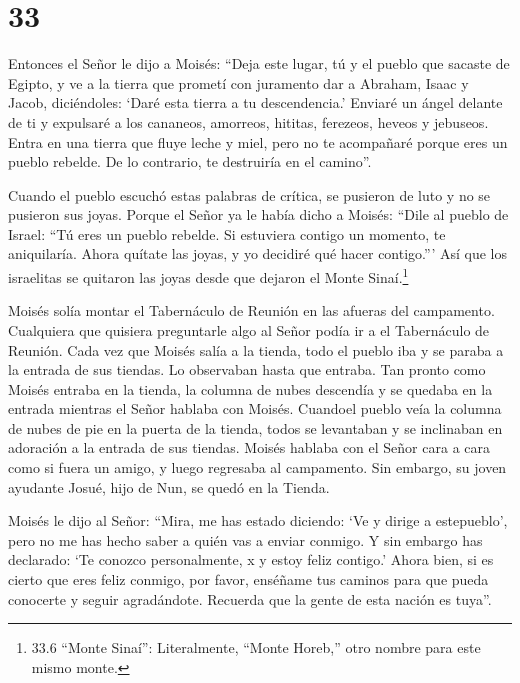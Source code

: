 \hypertarget{section-32}{%
\section{33}\label{section-32}}

 Entonces el Señor le dijo a Moisés: ``Deja este lugar, tú y
el pueblo que sacaste de Egipto, y ve a la tierra que prometí con
juramento dar a Abraham, Isaac y Jacob, diciéndoles: `Daré esta tierra a
tu descendencia.'  Enviaré un ángel delante de ti y
expulsaré a los cananeos, amorreos, hititas, ferezeos, heveos y
jebuseos.  Entra en una tierra que fluye leche y miel, pero
no te acompañaré porque eres un pueblo rebelde. De lo contrario, te
destruiría en el camino''.

 Cuando el pueblo escuchó estas palabras de crítica, se
pusieron de luto y no se pusieron sus joyas.  Porque el
Señor ya le había dicho a Moisés: ``Dile al pueblo de Israel: ``Tú eres
un pueblo rebelde. Si estuviera contigo un momento, te aniquilaría.
Ahora quítate las joyas, y yo decidiré qué hacer contigo.'''
 Así que los israelitas se quitaron las joyas desde que
dejaron el Monte Sinaí.\footnote{33.6 ``Monte Sinaí'': Literalmente,
  ``Monte Horeb,'' otro nombre para este mismo monte.}

 Moisés solía montar el Tabernáculo de Reunión en las
afueras del campamento. Cualquiera que quisiera preguntarle algo al
Señor podía ir a el Tabernáculo de Reunión.  Cada vez que
Moisés salía a la tienda, todo el pueblo iba y se paraba a la entrada de
sus tiendas. Lo observaban hasta que entraba.  Tan pronto
como Moisés entraba en la tienda, la columna de nubes descendía y se
quedaba en la entrada mientras el Señor hablaba con Moisés.
 Cuandoel pueblo veía la columna de nubes de pie en la
puerta de la tienda, todos se levantaban y se inclinaban en adoración a
la entrada de sus tiendas.  Moisés hablaba con el Señor
cara a cara como si fuera un amigo, y luego regresaba al campamento. Sin
embargo, su joven ayudante Josué, hijo de Nun, se quedó en la Tienda.

 Moisés le dijo al Señor: ``Mira, me has estado diciendo:
`Ve y dirige a estepueblo', pero no me has hecho saber a quién vas a
enviar conmigo. Y sin embargo has declarado: `Te conozco personalmente,
x y estoy feliz contigo.'  Ahora bien, si es cierto que
eres feliz conmigo, por favor, enséñame tus caminos para que pueda
conocerte y seguir agradándote. Recuerda que la gente de esta nación es
tuya''.

